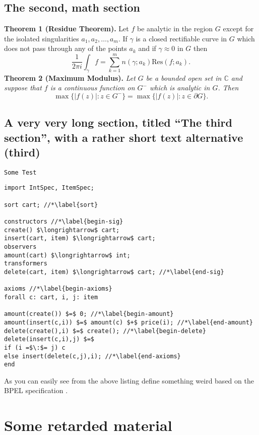 \documentclass[mscthesis]{usiinfthesis}
\begin{document}
 \section{The second, math section}

\textbf{Theorem 1 (Residue Theorem).}
Let $f$ be analytic in the region $G$ except for the isolated singularities $a_1,a_2,\ldots,a_m$. If $\gamma$ is a closed rectifiable curve in $G$ which does not pass through any of the points $a_k$ and if $\gamma\approx 0$ in $G$ then
\[
\frac{1}{2\pi i}\int_\gamma f = \sum_{k=1}^m n(\gamma;a_k) \text{Res}(f;a_k).
\]
\textbf{Theorem 2 (Maximum Modulus).}
\emph{Let $G$ be a bounded open set in $\mathbb{C}$ and suppose that $f$ is a continuous function on $G^-$ which is analytic in $G$. Then}
\[
\max\{|f(z)|:z\in G^-\}=\max \{|f(z)|:z\in \partial G \}.
\]

\section[third]{A very very long section, titled ``The third section'', with
  a rather  short text alternative (third)}
\lipsum \texttt{Some Test}
\begin{lstlisting}
import IntSpec, ItemSpec;

sort cart; //*\label{sort}

constructors //*\label{begin-sig}
create() $\longrightarrow$ cart;
insert(cart, item) $\longrightarrow$ cart;
observers
amount(cart) $\longrightarrow$ int;
transformers
delete(cart, item) $\longrightarrow$ cart; //*\label{end-sig}

axioms //*\label{begin-axioms}
forall c: cart, i, j: item 

amount(create()) $=$ 0; //*\label{begin-amount}
amount(insert(c,i)) $=$ amount(c) $+$ price(i); //*\label{end-amount}
delete(create(),i) $=$ create(); //*\label{begin-delete}
delete(insert(c,i),j) $=$
if (i =$\:$= j) c
else insert(delete(c,j),i); //*\label{end-axioms}
end
\end{lstlisting}

As you can easily see from the above listing \citet{bbggs:iet07}
define something weird based on the BPEL specification
\citep{bpelspec}.
\nocite{*}

\appendix %

\chapter{Some retarded material}
\end{document}

